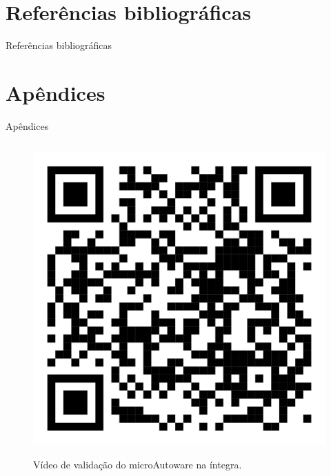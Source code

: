 \documentclass{if-beamer}
\begin{document}
\section{Referências bibliográficas}
\begin{frame}{Referências bibliográficas}
   
\end{frame}

\section{Apêndices}

\begin{frame}{Apêndices}
	
	\begin{columns}
		
		\begin{column}{0.5\textwidth}
			
			\begin{figure}[H]
				\centering
				\href{https://youtu.be/7OOIyOqvU_o}{\includegraphics[width=0.8\linewidth]{qr_code_youtube}}
				\caption{Vídeo de validação do microAutoware na íntegra.}
				\label{fig:qr_code_youtube}
			\end{figure}
		
		
			
		\end{column}
		

\end{columns}
\end{frame}
\end{document}
